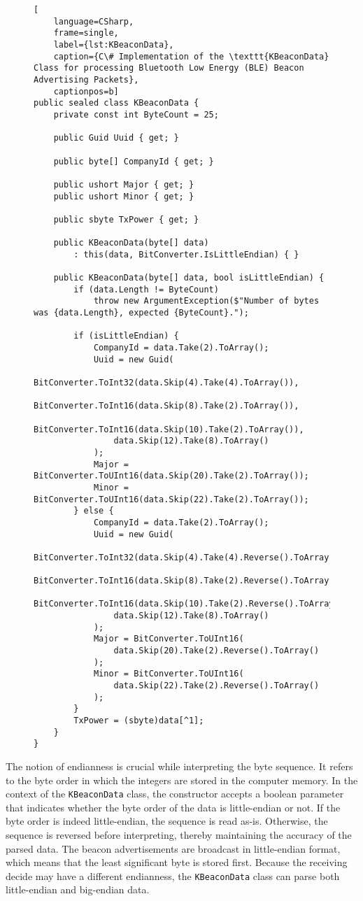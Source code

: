 \begin{figure}[H]
\begin{lstlisting}[
	language=CSharp, 
	frame=single, 
	label={lst:KBeaconData},
	caption={C\# Implementation of the \texttt{KBeaconData} Class for processing Bluetooth Low Energy (BLE) Beacon Advertising Packets}, 
	captionpos=b] 
public sealed class KBeaconData {
	private const int ByteCount = 25;

	public Guid Uuid { get; }

	public byte[] CompanyId { get; }

	public ushort Major { get; }
	public ushort Minor { get; }

	public sbyte TxPower { get; }

	public KBeaconData(byte[] data) 
		: this(data, BitConverter.IsLittleEndian) { }

	public KBeaconData(byte[] data, bool isLittleEndian) {
		if (data.Length != ByteCount)
			throw new ArgumentException($"Number of bytes was {data.Length}, expected {ByteCount}.");

		if (isLittleEndian) {
			CompanyId = data.Take(2).ToArray();
			Uuid = new Guid(
				BitConverter.ToInt32(data.Skip(4).Take(4).ToArray()),
				BitConverter.ToInt16(data.Skip(8).Take(2).ToArray()),
				BitConverter.ToInt16(data.Skip(10).Take(2).ToArray()),
				data.Skip(12).Take(8).ToArray()
			);
			Major = BitConverter.ToUInt16(data.Skip(20).Take(2).ToArray());
			Minor = BitConverter.ToUInt16(data.Skip(22).Take(2).ToArray());
		} else {
			CompanyId = data.Take(2).ToArray();
			Uuid = new Guid(
				BitConverter.ToInt32(data.Skip(4).Take(4).Reverse().ToArray()),
				BitConverter.ToInt16(data.Skip(8).Take(2).Reverse().ToArray()),
				BitConverter.ToInt16(data.Skip(10).Take(2).Reverse().ToArray()),
				data.Skip(12).Take(8).ToArray()
			);
			Major = BitConverter.ToUInt16(
				data.Skip(20).Take(2).Reverse().ToArray()
			);
			Minor = BitConverter.ToUInt16(
				data.Skip(22).Take(2).Reverse().ToArray()
			);
		}
		TxPower = (sbyte)data[^1];
	}
}
\end{lstlisting}
\end{figure}

The notion of endianness is crucial while interpreting the byte sequence.
It refers to the byte order in which the integers are stored in the computer memory. In the context of the \texttt{KBeaconData} class, the constructor accepts a boolean parameter that indicates whether the byte order of the data is little-endian or not. If the byte order is indeed little-endian, the sequence is read as-is. Otherwise, the sequence is reversed before interpreting, thereby maintaining the accuracy of the parsed data.
The beacon advertisements are broadcast in little-endian format, which means that the least significant byte is stored first.\cite{CoreSpecification2023}
Because the receiving decide may have a different endianness, the \texttt{KBeaconData} class can parse both little-endian and big-endian data.


